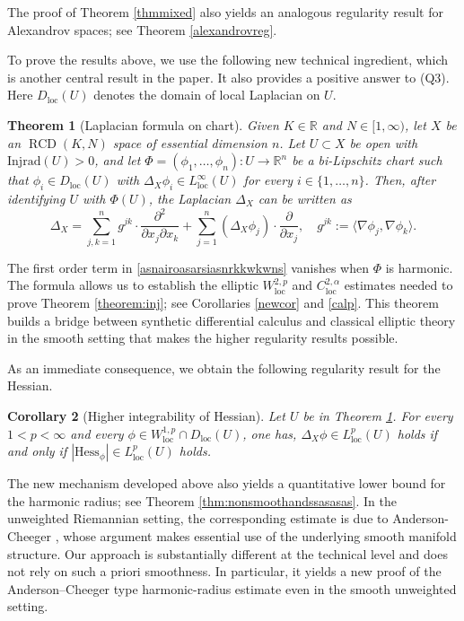 \documentclass[11pt,reqno]{amsart}
\newtheorem{theorem}{Theorem}[section]
\newtheorem{corollary}[theorem]{Corollary}
\theoremstyle{definition}
\numberwithin{equation}{section}
\newcommand{\dR}{\mathbb{R}}
\DeclareMathOperator{\loc}{loc}
\DeclareMathOperator{\RCD}{RCD}
\begin{document}
The proof of Theorem \ref{thmmixed} also yields an analogous regularity result for Alexandrov spaces; see Theorem \ref{alexandrovreg}.


To prove the results above, we use the following new technical ingredient, which is another central result in the paper. It also provides a positive answer to (Q3). Here $D_{\loc}(U)$ denotes the domain of local Laplacian on $U$. 

\begin{theorem}[Laplacian formula on chart]\label{thmlapchart}
    Given $K\in\dR$ and $N \in [1, \infty)$, let $X$ be an $\RCD(K, N)$ space  of essential dimension $n$. Let $U \subset X$ be open  with $\mathrm{Injrad}(U)>0$, and let $\Phi=(\phi_{1}, \ldots, \phi_{n}):U \to \mathbb{R}^n$ be a bi-Lipschitz chart such that $\phi_i \in D_{\loc}(U)$ with $\Delta_X\phi_i \in L^{\infty}_{\loc}(U)$ for every $i\in \{1,\ldots, n\}$. Then, after identifying $U$ with $\Phi(U)$, the Laplacian $\Delta_X$ can be written as 
    \begin{equation}\label{asnairoasarsiasnrkkwkwns}
        \Delta_X =\sum_{j,k=1}^ng^{jk}\cdot\frac{\partial^2}{\partial x_j\partial x_k}+\sum_{j=1}^n (\Delta_X\phi_{j})\cdot\frac{\partial}{\partial x_j}, \quad g^{jk}:=\langle \nabla \phi_j, \nabla \phi_k\rangle.
    \end{equation}
\end{theorem}
The first order term in \eqref{asnairoasarsiasnrkkwkwns} vanishes when $\Phi$ is harmonic. 
The formula allows us to establish the elliptic $W^{2,p}_{\loc}$ and $C^{2, \alpha}_{\loc}$ estimates needed to prove Theorem \ref{theorem:inj}; see Corollaries \ref{newcor} and \ref{calp}. 
This theorem builds a bridge between synthetic differential calculus and classical elliptic theory in the smooth setting that makes the higher regularity results possible.


As an immediate consequence, we obtain the following regularity result for the Hessian. 



\begin{corollary}[Higher integrability of Hessian]\label{corhess}
    Let $U$ be in Theorem \ref{thmlapchart}. For every $1<p<\infty$ and every $\phi \in W^{1,p}_{\loc}\cap D_{\loc}(U)$, one has, $\Delta_X \phi \in L^{p}_{\loc}(U)$ holds if and only if $|\mathrm{Hess}_{\phi}| \in L^p_{\loc}(U)$ holds.

\end{corollary}


The new mechanism developed above also yields a quantitative lower bound for the harmonic radius; see Theorem \ref{thm:nonsmoothandssasasas}. In the unweighted Riemannian setting, the corresponding estimate is due to Anderson-Cheeger \cite{AC}, whose argument makes essential use of the underlying smooth manifold structure.  
Our approach is substantially different at the technical level and does not rely on such a priori smoothness. In particular, it yields a new proof of the Anderson–Cheeger type harmonic-radius estimate even in the smooth unweighted setting.
\end{document}
